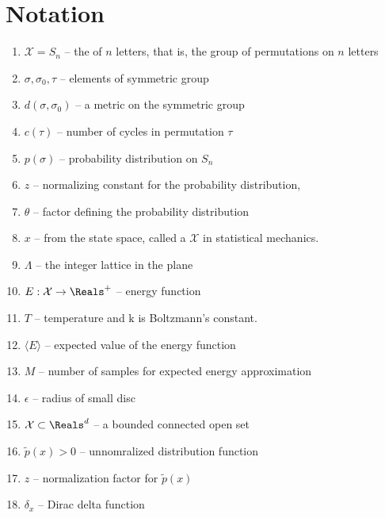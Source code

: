 \documentclass[12pt]{article}
\begin{document}
\hr

\section*{Notation}
\begin{enumerate}
    \item
        \( \mathcal{X} = S_n \) -- the  of \( n \)
        letters, that is, the group of permutations on \( n \) letters
    \item
        \( \sigma, \sigma_0, \tau \) -- elements of symmetric group
    \item
        \( d(\sigma, \sigma_0) \) -- a metric on the symmetric group
    \item
        \( c(\tau) \) -- number of cycles in permutation \( \tau \)
    \item
        \( p(\sigma) \) -- probability distribution on \( S_n \)
    \item
        \( z \) -- normalizing constant for the probability
        distribution,
    \item
        \( \theta \) -- factor defining the probability distribution
    \item
        \( x \) --  from the state space, called a
         \( \mathcal{X} \) in statistical
        mechanics.
    \item
        \( \Lambda \) -- the integer lattice in the plane
    \item
        \( E:  \mathcal{X} \to \Reals^+ \) -- energy function
    \item
        \( T \) -- temperature and \( \mathrm{k} \) is Boltzmann's
        constant.
    \item
        \( \langle E\rangle \) -- expected value of the energy function
    \item
        \( M \) -- number of samples for expected energy approximation
    \item
        \( \epsilon \) -- radius of small disc
    \item
        \( \mathcal{X} \subset \Reals^d \) -- a bounded connected open
        set
    \item
        \( \tilde{p}(x) > 0 \) -- unnomralized distribution function
    \item
        \( z \) -- normalization factor for \( \tilde{p}(x) \)
    \item
        \( \delta_x \) -- Dirac delta function
\end{enumerate}
\end{document}
